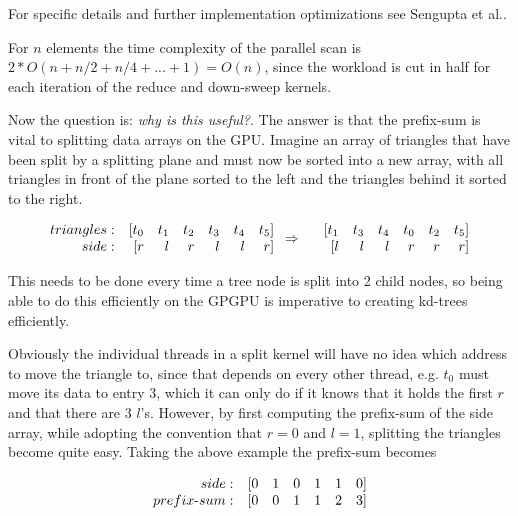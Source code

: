 For specific details and further implementation optimizations see
Sengupta et al..



For $n$ elements the time complexity of the parallel scan is $2 * O(n
+ n/2 + n/4 + ... + 1) = O(n)$, since the workload is cut in half for
each iteration of the reduce and down-sweep kernels.



Now the question is: \textit{why is this useful?}. The answer is that
the prefix-sum is vital to splitting data arrays on the GPU. Imagine
an array of triangles that have been split by a splitting plane and
must now be sorted into a new array, with all triangles in front of
the plane sorted to the left and the triangles behind it sorted to the
right. 

\begin{displaymath}
  \begin{array} {r r r r r r r}
    triangles: & [t_0 & t_1 & t_2 & t_3 & t_4 & t_5]\\
    side: & [r & l & r & l & l & r]\\
  \end{array}
  \Rightarrow
  \begin{array} {r r r r r r r}
    &[t_1 & t_3 & t_4 & t_0 & t_2 & t_5]\\
    &[l & l & l & r & r & r]\\
  \end{array}
\end{displaymath}

This needs to be done every time a tree node is split into 2 child
nodes, so being able to do this efficiently on the GPGPU is imperative
to creating kd-trees efficiently.

Obviously the individual threads in a split kernel will have no idea
which address to move the triangle to, since that depends on every
other thread, e.g. $t_0$ must move its data to entry 3, which it can
only do if it knows that it holds the first $r$ and that there are 3
$l$'s. However, by first computing the prefix-sum of the side array,
while adopting the convention that $r = 0$ and $l = 1$, splitting the
triangles become quite easy. Taking the above example the prefix-sum
becomes

\begin{displaymath}
  \begin{array} {r r r r r r r}
    side: & [0 & 1 & 0 & 1 & 1 & 0]\\
    prefix\text{-}sum: & [0 & 0 & 1 & 1 & 2 & 3]
  \end{array}
\end{displaymath}

